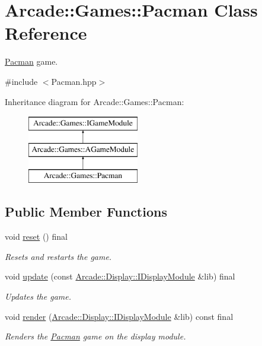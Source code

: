 \hypertarget{classArcade_1_1Games_1_1Pacman}{}\section{Arcade\+::Games\+::Pacman Class Reference}
\label{classArcade_1_1Games_1_1Pacman}


\mbox{\hyperlink{classArcade_1_1Games_1_1Pacman}{Pacman}} game.  




{\ttfamily \#include $<$Pacman.\+hpp$>$}

Inheritance diagram for Arcade\+::Games\+::Pacman\+:\begin{figure}[H]
\begin{center}
\leavevmode
\includegraphics[height=3.000000cm]{classArcade_1_1Games_1_1Pacman}
\end{center}
\end{figure}
\subsection*{Public Member Functions}
\begin{DoxyCompactItemize}
\item 
\mbox{\label{classArcade_1_1Games_1_1Pacman_ab22a7f3125e07169dc326eb3b89dba94}} 
void \mbox{\hyperlink{classArcade_1_1Games_1_1Pacman_ab22a7f3125e07169dc326eb3b89dba94}{reset}} () final
\begin{DoxyCompactList}\small\item\em Resets and restarts the game. \end{DoxyCompactList}\item 
void \mbox{\hyperlink{classArcade_1_1Games_1_1Pacman_aa6bc227c3f14cc8d66d11f2d32bed3ec}{update}} (const \mbox{\hyperlink{classArcade_1_1Display_1_1IDisplayModule}{Arcade\+::\+Display\+::\+I\+Display\+Module}} \&lib) final
\begin{DoxyCompactList}\small\item\em Updates the game. \end{DoxyCompactList}\item 
void \mbox{\hyperlink{classArcade_1_1Games_1_1Pacman_ab1a7408f265efbef12b4f9d1a6fb4512}{render}} (\mbox{\hyperlink{classArcade_1_1Display_1_1IDisplayModule}{Arcade\+::\+Display\+::\+I\+Display\+Module}} \&lib) const final
\begin{DoxyCompactList}\small\item\em Renders the \mbox{\hyperlink{classArcade_1_1Games_1_1Pacman}{Pacman}} game on the display module. \end{DoxyCompactList}\end{DoxyCompactItemize}

